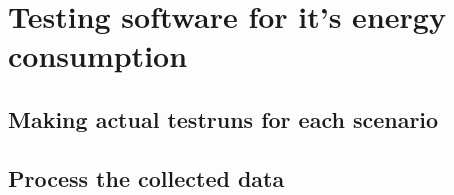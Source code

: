 \chapter{Testing software for it's energy consumption}
    \section{Making actual testruns for each scenario}

    \section{Process the collected data}